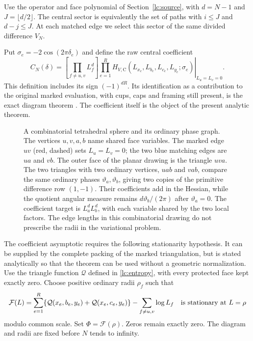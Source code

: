 Use the operator and face polynomial of Section~\ref{lc:source}, with
$d=N-1$ and $J=\lfloor d/2\rfloor$. The central sector is equivalently
the set of paths with $i\le J$ and $d-j\le J$. At each matched edge
we select this sector of the same divided difference $V_N$.

Put $\sigma_e=-2\cos(2\pi\delta_e)$ and define the raw central coefficient
\begin{equation}\label{sa:coefficient}
 C_N(\delta)=
 \left[\prod_{f\ne u,v}L_f^d\right]
 \left.\prod_{e=1}^R H_{V,\mathrm C}
       (L_{x_e},L_{b_e},L_{c_e},L_{y_e};\sigma_e)
                  \right|_{L_u=L_v=0}.
\end{equation}
This definition includes its sign $(-1)^{dR}$. Its identification as a
contribution to the original marked evaluation, with cups, caps and
framing still present, is the exact diagram theorem
\cite[Theorem 9.1 and Corollary 9.2]{FinitePaper}. The coefficient itself is
the object of the present analytic theorem.

\begin{figure}[t]
\centering

\caption{A combinatorial tetrahedral sphere and its ordinary phase graph.
The vertices $u,v,a,b$ name shared face variables. The marked edge $uv$
(red, dashed) sets $L_u=L_v=0$; the two blue matching edges are $ua$
and $vb$. The outer face of the planar drawing is the triangle $uva$.
The two triangles with two ordinary vertices, $uab$ and $vab$, compare the same
ordinary phases $\vartheta_a,\vartheta_b$, giving two copies of the
primitive difference row $(1,-1)$. Their coefficients add in the
Hessian, while the quotient angular measure remains
$d\vartheta_b/(2\pi)$ after $\vartheta_a=0$. The coefficient target is
$L_a^dL_b^d$, with each variable shared by the two local factors.
The edge lengths in this combinatorial drawing do not prescribe the radii
in the variational problem.}
\label{sa:shared-figure}
\end{figure}

The coefficient asymptotic requires the following stationarity hypothesis. It can be supplied by the
complete packing of the marked triangulation, but is stated analytically
so that the theorem can be used without a geometric normalization.
Use the triangle function $\mathcal Q$ defined in \eqref{lc:entropy},
with every protected face kept exactly zero.
Choose positive ordinary radii $\rho_f$ such that
\begin{equation}\label{sa:stationarity}
 \mathcal F(L)=\sum_{e=1}^R
     \{\mathcal Q(x_e,b_e,y_e)+\mathcal Q(x_e,c_e,y_e)\}
                         -\sum_{f\ne u,v}\log L_f
 \quad\text{is stationary at }L=\rho
\end{equation}
modulo common scale. Set $\Phi=\mathcal F(\rho)$.
Zeros remain exactly zero. The diagram and radii are fixed before $N$
tends to infinity.


